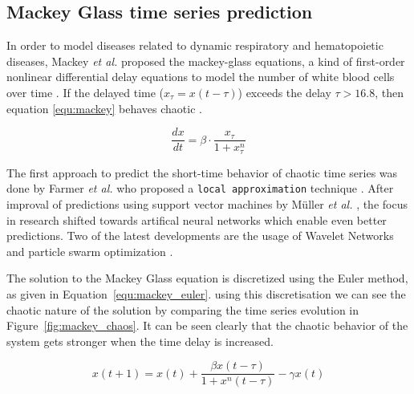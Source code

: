 \documentclass{article}
\begin{document}
\subsection{Mackey Glass time series prediction}

In order to model diseases related to dynamic respiratory and hematopoietic
diseases, Mackey \textit{et al.} proposed the mackey-glass equations, a kind of
first-order nonlinear differential delay equations to model 
the number of white blood cells over time \cite{mackey1977}. If the
delayed time ($x_{\tau} = x(t - \tau)$) exceeds the delay $\tau > 16.8$, then
equation \ref{equ:mackey} behaves chaotic \cite{farmer1982}.

\begin{equation}
  \frac{dx}{dt} = \beta \cdot \frac{x_{\tau}}{1 + x_{\tau}^n}
  \label{equ:mackey}
\end{equation}

The first approach to predict the short-time behavior of chaotic time series
was done by Farmer \textit{et al.} who proposed a \texttt{local approximation}
technique \cite{farmer1987}. After improval of predictions using support vector
machines by Müller \textit{et al.} \cite{muller1997}, the focus in research
shifted towards artifical neural networks which enable even better predictions.
Two of the latest developments are the usage of Wavelet Networks
\cite{alexandridis2013} and particle swarm optimization \cite{caraballo2016}.

The solution to the Mackey Glass equation is discretized using the Euler method,
as given in Equation~\ref{equ:mackey_euler}. using this discretisation we can
see the chaotic nature of the solution by comparing the time series evolution 
in
Figure~\ref{fig:mackey_chaos}. It can be seen clearly that the chaotic behavior
of the system gets stronger when the time delay is increased.

\begin{equation}
  x(t+1) = x(t) + \frac{\beta x(t - \tau)}{1 + x^{n}(t - \tau)} - \gamma x(t)
  \label{equ:mackey_euler}
\end{equation}
\end{document}
